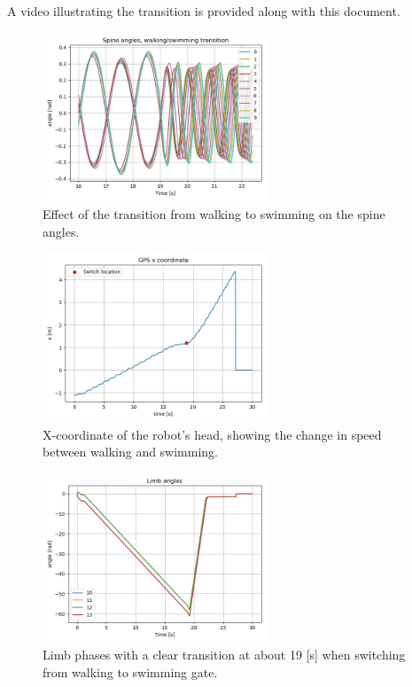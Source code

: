 \documentclass{cmc}
\begin{document}
A video illustrating the transition is provided along with this document. 

\begin{figure}
    \centering
    \includegraphics[width=0.6\textwidth]{figures/9g/spine_angles.jpg}
    \caption{Effect of the transition from walking to swimming on the spine angles.}
    \label{fig:9g_spine}
\end{figure}
\begin{figure}
    \centering
    \includegraphics[width=0.6\textwidth]{figures/9g/x_gps.jpg}
    \caption{X-coordinate of the robot's head, showing the change in speed between walking and swimming.}
    \label{fig:9g_x}
\end{figure}
\begin{figure}
    \centering
    \includegraphics[width=0.6\textwidth]{figures/9g/leg_angles.jpg}
    \caption{Limb phases with a clear transition at about 19 [s] when switching from walking to swimming gate.}
    \label{fig:9g_legs}
\end{figure}






\newpage


\label{sec:references}




\end{document}
